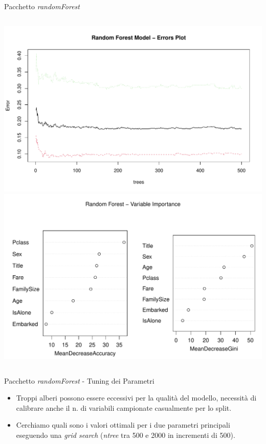 \documentclass[9pt, xcolor=table]{beamer}
\begin{document}
	\begin{frame}{Pacchetto \textit{randomForest}}
		
		
		\vfill
		
		\begin{columns}
			\centering
			\includegraphics[scale=0.26]{randomF-errors}
			\centering
			\includegraphics[scale=0.25]{randomF-var-importance}
		\end{columns}	
	\end{frame}

	\begin{frame}{Pacchetto \textit{randomForest} - Tuning dei Parametri}
		\begin{itemize}
			\item Troppi alberi possono essere eccessivi per la qualità del modello, necessità di calibrare anche il n. di variabili campionate casualmente per lo split.
			\item Cerchiamo quali sono i valori ottimali per i due parametri principali eseguendo una \textit{grid search} (\textit{ntree} tra 500 e 2000 in incrementi di 500).
		\end{itemize}
	
		\vfill
	
				
	\end{frame}
\end{document}

